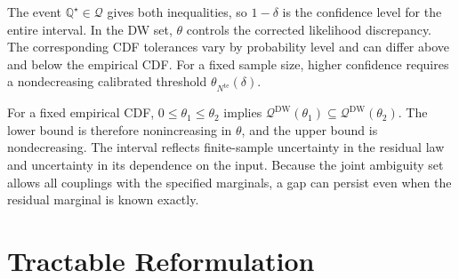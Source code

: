 \documentclass[review,11pt,3p,authoryear,nopreprintline]{elsarticle}
\begin{document}
The event $\mathbb Q^\star\in\mathscr Q$ gives both inequalities, so $1-\delta$ is the confidence level for the entire interval. In the DW set, $\theta$ controls the corrected likelihood discrepancy. The corresponding CDF tolerances vary by probability level and can differ above and below the empirical CDF. For a fixed sample size, higher confidence requires a nondecreasing calibrated threshold $\theta_{N^{\mathrm{te}}}(\delta)$.

For a fixed empirical CDF, $0\le\theta_1\le\theta_2$ implies $\mathscr Q^{\mathrm{DW}}(\theta_1)\subseteq\mathscr Q^{\mathrm{DW}}(\theta_2)$. The lower bound is therefore nonincreasing in $\theta$, and the upper bound is nondecreasing. The interval reflects finite-sample uncertainty in the residual law and uncertainty in its dependence on the input. Because the joint ambiguity set allows all couplings with the specified marginals, a gap can persist even when the residual marginal is known exactly.

\section{Tractable Reformulation}
\label{sec-reformulation}


\end{document}
